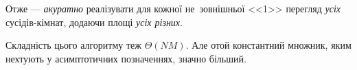 \documentclass[14pt,a4paper]{extarticle}
\renewcommand{\baselinestretch}{1.3125}
\begin{document}
Отже --- \emph{акуратно} реалізувати для кожної не~зовнішньої <<1>> перегляд \emph{усіх} сусідів-кімнат, додаючи площі \emph{усіх різних}.

Складність цього алгоритму теж $\Theta(NM)$. Але отой константний множник, яким нехтують у асимптотичних позначеннях, значно більший.






\renewcommand{\thecontestname}{Олімпіади з інформатики (програмування)}
\renewcommand{\thecontestlocation}{Черкаська обл.}
\renewcommand{\thecontestdate}{2013--2015 роки}


\end{document}

